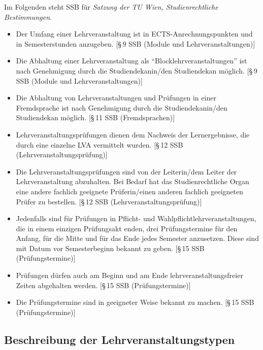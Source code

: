 Im Folgenden steht SSB für \emph{Satzung der TU Wien, Studienrechtliche Bestimmungen}.
\begin{itemize}
\item Der Umfang einer Lehrveranstaltung ist in
  ECTS-Anrechnungspunkten und in Semesterstunden anzugeben. [§\,9 SSB
  (Module und Lehrveranstaltungen)]
\item Die Abhaltung einer Lehrveranstaltung als "`Blocklehrveranstaltungen"'
  ist nach Genehmigung durch die Studiendekanin/den Studiendekan möglich.
  [§\,9 SSB (Module und Lehrveranstaltungen)]
\item Die Abhaltung von Lehrveranstaltungen und Prüfungen in einer
  Fremdsprache ist nach Genehmigung durch die Studiendekanin/den
  Studiendekan möglich. [§\,11 SSB (Fremdsprachen)]
\item Lehrveranstaltungsprüfungen dienen dem Nachweis der
  Lernergebnisse, die durch eine einzelne LVA vermittelt
  wurden. [§\,12 SSB (Lehrveranstaltungsprüfung)]
\item Die Lehrveranstaltungsprüfungen sind von der Leiterin/dem Leiter
  der Lehrveranstaltung abzuhalten.  Bei Bedarf hat das
  Studienrechtliche Organ eine andere fachlich geeignete
  Prüferin/einen anderen fachlich geeigneten Prüfer zu
  bestellen. [§\,12 SSB (Lehrveranstaltungsprüfung)]
\item Jedenfalls sind für Prüfungen in Pflicht- und
  Wahlpflichtlehrveranstaltungen, die in einem einzigen Prüfungsakt
  enden, drei Prüfungstermine für den Anfang, für die Mitte und für
  das Ende jedes Semester anzusetzen. Diese sind mit Datum vor
  Semesterbeginn bekannt zu geben. [§\,15 SSB (Prüfungstermine)]
\item Prüfungen dürfen auch am Beginn und am Ende lehrveranstaltungsfreier Zeiten abgehalten werden. [§\,15 SSB (Prüfungstermine)]
\item Die Prüfungstermine sind in geeigneter Weise bekannt zu
  machen. [§\,15 SSB (Prüfungstermine)]
\end{itemize}

\subsection*{Beschreibung der Lehrveranstaltungstypen}
\label{sec:LVA-Typ}

